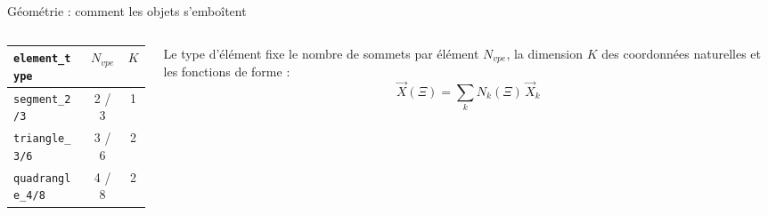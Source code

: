 \documentclass[aspectratio=169,11pt]{beamer}
\newcommand{\code}[1]{\texttt{\small #1}}
\begin{document}
\begin{frame}{Géométrie : comment les objets s'emboîtent}
  \medskip
  \begin{columns}[T]
    \begin{column}{0.44\textwidth}
      \centering\scriptsize
      \begin{tabular}{lcc}
        \toprule
        \code{element\_type} & $N_{vpe}$ & $K$ \\
        \midrule
        \code{segment\_2/3}    & 2 / 3 & 1 \\
        \code{triangle\_3/6}   & 3 / 6 & 2 \\
        \code{quadrangle\_4/8} & 4 / 8 & 2 \\
        \bottomrule
      \end{tabular}
    \end{column}
    \begin{column}{0.52\textwidth}\scriptsize
      Le type d'élément fixe le nombre de sommets par élément $N_{vpe}$, la dimension
      $K$ des coordonnées naturelles et les fonctions de forme :
      \[
        \vec{X}(\Xi) = \textstyle\sum_k N_k(\Xi)\, \vec{X}_k
      \]
    \end{column}
  \end{columns}
\end{frame}
 
\end{document}
